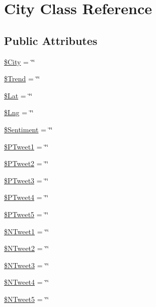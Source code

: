 \hypertarget{classCity}{}\section{City Class Reference}
\label{classCity}
\subsection*{Public Attributes}
\begin{DoxyCompactItemize}
\item 
\hyperlink{classCity_a37b890581b830d6dcb43dee2d8c98463}{\$\+City} = \char`\"{}\char`\"{}
\item 
\hyperlink{classCity_a32e0805ba9ae11b3aa658d60029df1fc}{\$\+Trend} = \char`\"{}\char`\"{}
\item 
\hyperlink{classCity_af2b3e408999c8ab317e80a107c543dc4}{\$\+Lat} = \char`\"{}\char`\"{}
\item 
\hyperlink{classCity_a8df2449cae23d59eff5e5fa2747155e6}{\$\+Lng} = \char`\"{}\char`\"{}
\item 
\hyperlink{classCity_af303329814ddeefe78effa154adde16d}{\$\+Sentiment} = \char`\"{}\char`\"{}
\item 
\hyperlink{classCity_a634b09cf48f8fa468da296007d6ff327}{\$\+P\+Tweet1} = \char`\"{}\char`\"{}
\item 
\hyperlink{classCity_a7e3650629a6fa7bb4b774f68384001b1}{\$\+P\+Tweet2} = \char`\"{}\char`\"{}
\item 
\hyperlink{classCity_ae5e9c77c78862ab192db09266a9042f3}{\$\+P\+Tweet3} = \char`\"{}\char`\"{}
\item 
\hyperlink{classCity_a1c1e5c48b136d0c5bdc2a28401162bb5}{\$\+P\+Tweet4} = \char`\"{}\char`\"{}
\item 
\hyperlink{classCity_a015736b4b7e53f4a8fb4b8913879eda5}{\$\+P\+Tweet5} = \char`\"{}\char`\"{}
\item 
\hyperlink{classCity_af0ef76f4a336e0e471971cfdcc9a4da6}{\$\+N\+Tweet1} = \char`\"{}\char`\"{}
\item 
\hyperlink{classCity_a91717a27f9d2f1c3243fe1388a1013f4}{\$\+N\+Tweet2} = \char`\"{}\char`\"{}
\item 
\hyperlink{classCity_a766a7b2a383e4e36c67e01c8386b8468}{\$\+N\+Tweet3} = \char`\"{}\char`\"{}
\item 
\hyperlink{classCity_a9ea6a35aacc8be85c331143cde8a69c0}{\$\+N\+Tweet4} = \char`\"{}\char`\"{}
\item 
\hyperlink{classCity_a08dcb59ae220e7763f2f32ac63d89018}{\$\+N\+Tweet5} = \char`\"{}\char`\"{}
\end{DoxyCompactItemize}


